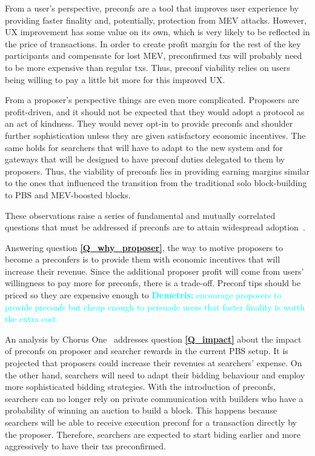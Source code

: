 \documentclass[a4paper]{article}
\theoremstyle{boldstyle}
\newcommand{\dk}[1]{\textcolor{cyan}{\textbf{Demetris:} #1}}
\begin{document}
    From a user's perspective, preconfs are a tool that improves user experience by providing faster finality and, potentially, protection from MEV attacks. However, UX improvement has some value on its own, which is very likely to be reflected in the price of transactions. In order to create profit margin for the rest of the key participants and compensate for lost MEV, preconfirmed txs will probably need to be more expensive than regular txs. Thus, preconf viability relies on users being willing to pay a little bit more for this improved UX. 

    From a proposer's perspective things are even more complicated. Proposers are profit-driven, and it should not be expected that they would adopt a protocol as an act of kindness. They would never opt-in to provide preconfs and shoulder further sophistication unless they are given satisfactory economic incentives. The same holds for searchers that will have to adapt to the new system and for gateways that will be designed to have preconf duties delegated to them by proposers. Thus, the viability of preconfs lies in providing earning margins similar to the ones that influenced the transition from the traditional solo block-building to PBS and MEV-boosted blocks.

    These observations raise a series of fundamental and mutually correlated questions that must be addressed if preconfs are to attain widespread adoption~\cite{W:EconomicViabilityofPreconfirmations}. 

    
    Answering question \textbf{\ref{Q_why_proposer}}, the way to motive proposers to become a preconfers is to provide them with economic incentives that will increase their revenue. Since the additional proposer profit will come from users' willingness to pay more for preconfs, there is a trade-off. Preconf tips should be priced so they are expensive enough to \dk{encourage proposers to provide preconfs but cheap enough to persuade users that faster finality is worth the extra cost.   }
 
    An analysis by Chorus One~\cite{W:PreconfirmationsundertheNOlens} addresses question \textbf{\ref{Q_impact}} about the impact of preconfs on proposer and searcher rewards in the current PBS setup. It is projected that proposers could increase their revenues at searchers' expense. On the other hand, searchers will need to adapt their bidding behaviour and employ more sophisticated bidding strategies. With the introduction of preconfs, searchers can no longer rely on private communication with builders who have a probability of winning an auction to build a block. This happens because searchers will be able to receive execution preconf for a transaction directly by the proposer. Therefore, searchers are expected to start biding earlier and more aggressively to have their txs preconfirmed.
\end{document}
